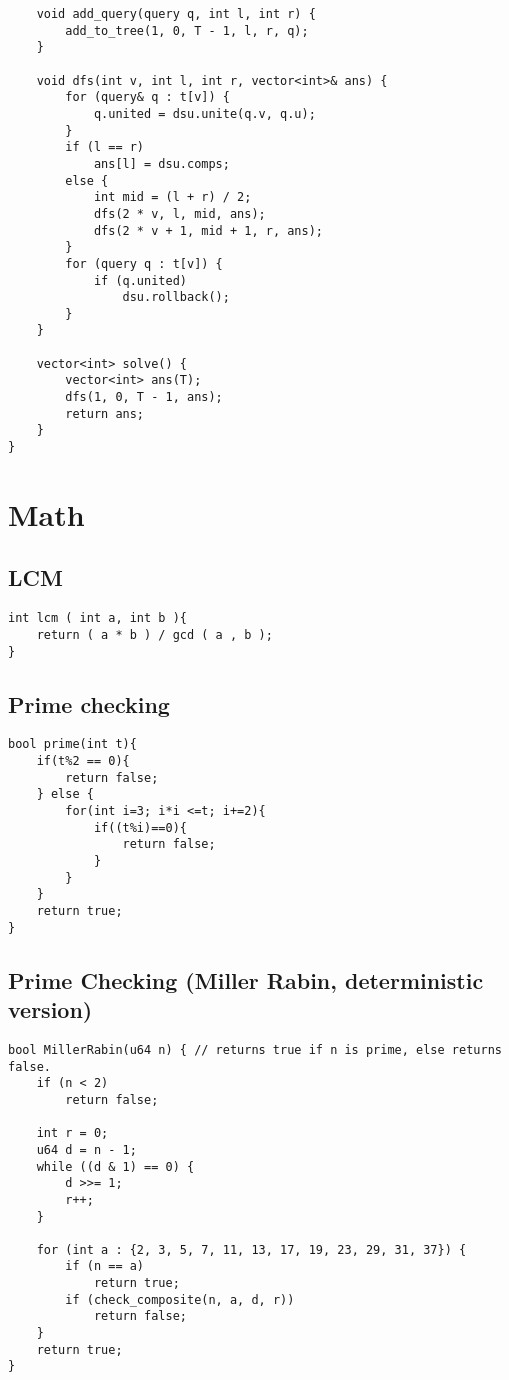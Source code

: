 \documentclass{article}
\begin{document}
\begin{lstlisting}
    void add_query(query q, int l, int r) {
        add_to_tree(1, 0, T - 1, l, r, q);
    }

    void dfs(int v, int l, int r, vector<int>& ans) {
        for (query& q : t[v]) {
            q.united = dsu.unite(q.v, q.u);
        }
        if (l == r)
            ans[l] = dsu.comps;
        else {
            int mid = (l + r) / 2;
            dfs(2 * v, l, mid, ans);
            dfs(2 * v + 1, mid + 1, r, ans);
        }
        for (query q : t[v]) {
            if (q.united)
                dsu.rollback();
        }
    }

    vector<int> solve() {
        vector<int> ans(T);
        dfs(1, 0, T - 1, ans);
        return ans;
    }
}
\end{lstlisting}

\section{Math}
\subsection{LCM}
\begin{lstlisting}
int lcm ( int a, int b ){
    return ( a * b ) / gcd ( a , b );
}

\end{lstlisting}
\subsection{Prime checking}
\begin{lstlisting}
bool prime(int t){
    if(t%2 == 0){
        return false;
    } else {
        for(int i=3; i*i <=t; i+=2){
            if((t%i)==0){
                return false;
            }
        }
    }
    return true;
}

\end{lstlisting}
\subsection{Prime Checking (Miller Rabin, deterministic version)}
\begin{lstlisting}
bool MillerRabin(u64 n) { // returns true if n is prime, else returns false.
    if (n < 2)
        return false;

    int r = 0;
    u64 d = n - 1;
    while ((d & 1) == 0) {
        d >>= 1;
        r++;
    }

    for (int a : {2, 3, 5, 7, 11, 13, 17, 19, 23, 29, 31, 37}) {
        if (n == a)
            return true;
        if (check_composite(n, a, d, r))
            return false;
    }
    return true;
}
\end{lstlisting}
\end{document}
